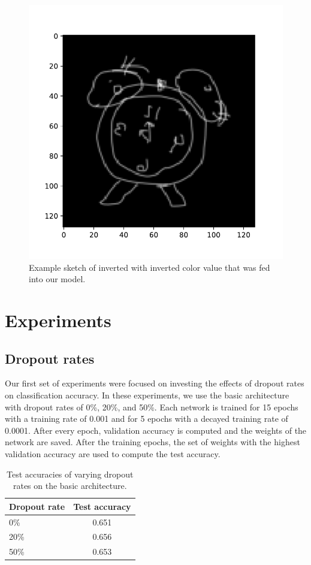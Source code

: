 \documentclass[10pt,twocolumn,letterpaper]{article}
\begin{document}
\begin{figure}[h]
	\begin{center}
	\includegraphics[width=.5\linewidth]{invert_colors_2}
	\caption{Example sketch of inverted with inverted color value that was fed into our model.}
	\end{center}
\end{figure}
 


\section{Experiments}
\subsection{Dropout rates}
Our first set of experiments were focused on investing the effects of dropout rates on classification accuracy. In these experiments, we use the basic architecture with dropout rates of 0\%, 20\%, and 50\%. Each network is trained for 15 epochs with a training rate of 0.001 and for 5 epochs with a decayed training rate of 0.0001. After every epoch, validation accuracy is computed and the weights of the network are saved. After the training epochs, the set of weights with the highest validation accuracy are used to compute the test accuracy.

\begin{table}[h]
	\begin{center}
	\begin{tabular}{l | c}
	Dropout rate & Test accuracy \\ \hline \hline
	0\% & 0.651 \\
	20\% & 0.656 \\
	50\% & 0.653 \\
	\end{tabular}
	\caption{Test accuracies of varying dropout rates on the basic architecture.}
	\end{center}
\end{table}
\end{document}
